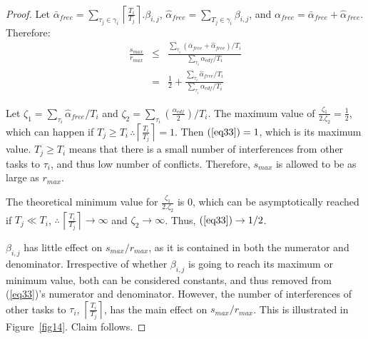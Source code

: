 \documentclass[letter]{sig-alternate}
\begin{document}
\begin{proof}
Let $\bar{\alpha}_{free}=\sum_{\tau_{j}\in\gamma_{i}}\left\lceil\frac{T_{i}}{T_{j}}\right\rceil.\beta_{i,j}$,  $\hat{\alpha}_{free}=\sum_{T_{j}\in\gamma_{i}}\beta_{i,j}$, and $\alpha_{free}=\bar{\alpha}_{free}+\hat{\alpha}_{free}.$ Therefore: 
\begin{eqnarray}
\frac{s_{max}}{r_{max}} & \le & \frac{\sum_{\tau_{i}}(\bar{\alpha}_{free} +\hat{\alpha}_{free})/T_{i}}{\sum_{\tau_{i}}\alpha_{edf}/T_{i}}\nonumber \\
 & = & \frac{1}{2}+\frac{\sum_{\tau_{i}}\hat{\alpha}_{free} /T_{i}}{\sum_{\tau_{i}}\alpha_{edf}/T_{i}}
 \label{eq33}
 \end{eqnarray}

Let $\zeta_{1}=\sum_{\tau_{i}}\hat{\alpha}_{free}/T_{i}$
and $\zeta_{2}=\sum_{\tau_{i}}\left(\frac{\alpha_{edf}}{2}\right)/T_{i}$. The maximum value of $\frac{\zeta_{1}}{2.\zeta_{2}}=\frac{1}{2}$, which can happen if $T_{j}\ge T_{i}\,\therefore\left\lceil\frac{T_{i}}{T_{j}}\right\rceil=1$. Then $(\ref{eq33})=1$, which is its maximum value. $T_{j}\ge T_{i}$ means that there is a small number of interferences from other tasks
to $\tau_{i}$, and thus low number of conflicts. Therefore, $s_{max}$ is
allowed to be as large as $r_{max}$.

The theoretical minimum value for $\frac{\zeta_{1}}{2.\zeta_{2}}$
is $0$, which can be asymptotically reached if $T_{j}\ll T_{i}$,
$\therefore\,\left\lceil\frac{T_{i}}{T_{j}}\right\rceil\rightarrow\infty$
and $\zeta_{2}\rightarrow\infty$. Thus, $(\ref{eq33})\rightarrow1/2$.

$\beta_{i,j}$ has little effect on $s_{max}/r_{max}$, 
as it is contained in both the numerator and denominator. Irrespective of whether $\beta_{i,j}$ is going to reach its maximum or minimum value, both can be considered constants, and thus removed from (\ref{eq33})'s numerator and denominator. 
However, the number of
interferences of other tasks to $\tau_{i}$, $\left\lceil\frac{T_{i}}{T_{j}}\right\rceil$,
has the main effect on $s_{max}/r_{max}$. This is illustrated in Figure~\ref{fig14}. Claim follows.
\end{proof}
\end{document}
